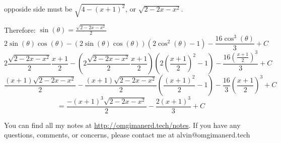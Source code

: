 \documentclass{math}
\begin{document}
opposide side must be \( \sqrt{4-(x+1)^{2}} \), or \( \sqrt{2-2x-x^{2}} \).
\begin{center}
\end{center}
Therefore: \( \sin(\theta) = \frac{\sqrt{2-2x-x^{2}}}{2} \)
\[ 2\sin(\theta)\cos(\theta)-
   (2\sin(\theta)\cos(\theta))(2\cos^{2}(\theta)-1)-
   \frac{16\cos^{3}(\theta)}{3}+C \]
\[ 2\frac{\sqrt{2-2x-x^{2}}}{2}\frac{x+1}{2}-
   (2\frac{\sqrt{2-2x-x^{2}}}{2}\frac{x+1}{2})(2(\frac{x+1}{2})^{2}-1)-
   \frac{16(\frac{x+1}{2})^{3}}{3}+C \]
\[ \frac{(x+1)\sqrt{2-2x-x^{2}}}{2}-
   \frac{(x+1)\sqrt{2-2x-x^{2}}}{2}(\frac{(x+1)^{2}}{2}-1)-
   \frac{16}{3}(\frac{x+1}{2})^{3}+C \]
\[ = \frac{-(x+1)^{3}\sqrt{2-2x-x^{2}}}{2}-\frac{2(x+1)^{3}}{3}+C \]

\begin{center}
  You can find all my notes at \url{http://omgimanerd.tech/notes}. If you have
  any questions, comments, or concerns, please contact me at
  alvin@omgimanerd.tech
\end{center}
\end{document}
